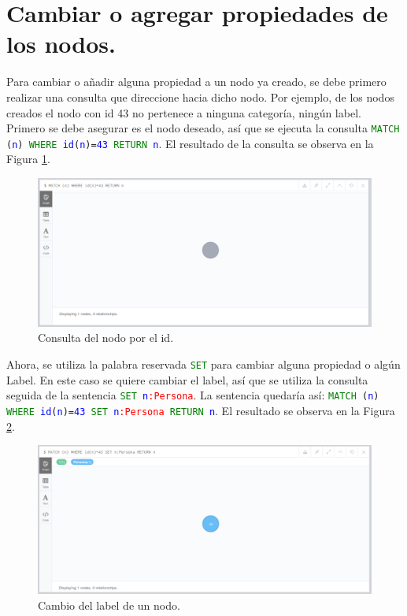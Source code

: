 \documentclass[conference]{IEEEtran}
\begin{document}
\section{Cambiar o agregar propiedades de los nodos.}

Para cambiar o añadir alguna propiedad a un nodo ya creado, se debe primero realizar una consulta que direccione hacia dicho nodo. Por ejemplo, de los nodos creados el nodo con id 43 no pertenece a ninguna categoría, ningún label. Primero se debe asegurar es el nodo deseado, así que se ejecuta la consulta \texttt{\textcolor{green}{MATCH} (\textcolor{blue}{n}) \textcolor{green}{WHERE} \textcolor{blue}{id}(\textcolor{blue}{n})=\textcolor{blue}{43} \textcolor{green}{RETURN} \textcolor{blue}{n}}. El resultado de la consulta se observa en la Figura \ref{fig26}.

\begin{figure}[H]
\begin{center}
\includegraphics[width= 0.45 \textwidth]{consulta_id2.png}
\end{center}
\caption{Consulta del nodo por el id.}
\label{fig26}
\end{figure}

Ahora, se utiliza la palabra reservada \texttt{\textcolor{green}{SET}} para cambiar alguna propiedad o algún Label. En este caso se quiere cambiar el label, así que se utiliza la consulta seguida de la sentencia \texttt{\textcolor{green}{SET} \textcolor{blue}{n}\textcolor{red}{:Persona}}. La sentencia quedaría así: \texttt{\textcolor{green}{MATCH} (\textcolor{blue}{n}) \textcolor{green}{WHERE} \textcolor{blue}{id}(\textcolor{blue}{n})=\textcolor{blue}{43} \textcolor{green}{SET} \textcolor{blue}{n}\textcolor{red}{:Persona} \textcolor{green}{RETURN} \textcolor{blue}{n}}. El resultado se observa en la Figura \ref{fig27}.


\begin{figure}[H]
\begin{center}
\includegraphics[width= 0.45 \textwidth]{set_label1.png}
\end{center}
\caption{Cambio del label de un nodo.}
\label{fig27}
\end{figure}
\end{document}
